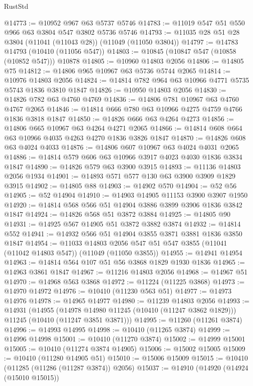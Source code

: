 \begin{lexlean}{RustStd}
\begin{coremodule}
@14773 := @10952 @967 @63 @5737 @5746
@14783 := @11019 @547 @51 @550 @966 @63 @3804 @547 @3802 @5736 @5746
@14793 := @11035 @28 @51 @28 @3804 (@11041 (@11043 @28)) (@11049 (@11050 @3804))
@14797 := @14783 @14793 (@10410 (@11056 @547))
@14803 := @10845 (@10847 @547 (@10858 (@10852 @547))) @10878
@14805 := @10960 @14803 @2056
@14806 := @14805 @75
@14812 := @14806 @965 @10967 @63 @5736 @5744 @2065
@14814 := @10976 @14803 @2056
@14824 := @14814 @782 @964 @63 @10966 @4771 @5735 @5743 @1836 @3810 @1847
@14826 := @10950 @14803 @2056
@14830 := @14826 @782 @63 @4760 @4769
@14836 := @14806 @781 @10967 @63 @4760 @4767 @2065
@14846 := @14814 @666 @780 @63 @10966 @4275 @4759 @4766 @1836 @3818 @1847
@14850 := @14826 @666 @63 @4264 @4273
@14856 := @14806 @665 @10967 @63 @4264 @4271 @2065
@14866 := @14814 @608 @664 @63 @10966 @4035 @4263 @4270 @1836 @3826 @1847
@14870 := @14826 @608 @63 @4024 @4033
@14876 := @14806 @607 @10967 @63 @4024 @4031 @2065
@14886 := @14814 @579 @606 @63 @10966 @3917 @4023 @4030 @1836 @3834 @1847
@14890 := @14826 @579 @63 @3900 @3915
@14893 := @11136 @14803 @2056 @1934
@14901 := @14893 @571 @577 @130 @63 @3900 @3909 @1829 @3915
@14902 := @14805 @88
@14903 := @14902 @570
@14904 := @52 @56
@14905 := @52 @14904
@14910 := @14903 @14905 @11153 @3900 @3907 @1950
@14920 := @14814 @568 @566 @51 @14904 @3886 @3899 @3906 @1836 @3842 @1847
@14924 := @14826 @568 @51 @3872 @3884
@14925 := @14805 @90
@14931 := @14925 @567 @14905 @51 @3872 @3882 @3874
@14932 := @14814 @552
@14941 := @14932 @566 @51 @14904 @3855 @3871 @3881 @1836 @3850 @1847
@14954 := @11033
    @14803
    @2056
    @547
    @51
    @547
    @3855
    (@11041 (@11042 @14803 @547))
    (@11049 (@11050 @3855))
@14955 := @14941 @14954
@14963 := @14814 @564 @107 @51 @56 @3868 @1829 @1930 @1836
@14965 := @14963 @3861 @1847
@14967 := @11216 @14803 @2056
@14968 := @14967 @51
@14970 := @14968 @563 @3868
@14972 := @11224 (@11225 @3868)
@14973 := @14970 @14972
@14976 := @10410 (@11230 @563 @51)
@14977 := @14973 @14976
@14978 := @14965 @14977
@14980 := @11239 @14803 @2056
@14993 := @14931
    (@14955
      (@14978 @14980 @11245 (@10410 (@11247 @3862 @1829)))
      @11245
      (@10410 (@11247 @3851 @3871)))
@14995 := @11260 (@11261 @3874)
@14996 := @14993 @14995
@14998 := @10410 (@11265 @3874)
@14999 := @14996 @14998
@15001 := @10410 (@11270 @3874)
@15002 := @14999 @15001
@15005 := @10410 (@11274 @3874 @14905)
@15006 := @15002 @15005
@15009 := @10410 (@11280 @14905 @51)
@15010 := @15006 @15009
@15015 := @10410 (@11285 (@11286 (@11287 @3874)) @2056)
@15037 := @14910
    (@14920
      (@14924 (@15010 @15015))

\end{coremodule}
\end{lexlean}
